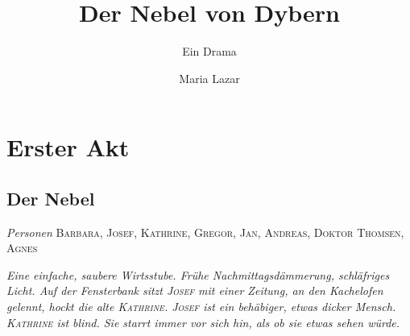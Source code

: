 \documentclass[
	final,
	a4paper,
	ngerman,
	mpinclude = true, %
	twoside = true,
	open = right,
	cleardoublepage = plain,
	DIV = 13,
	BCOR = 1cm,
	titlepage = firstiscover,
	]{scrbook}
\title{Der Nebel von Dybern}
\subtitle{Ein Drama}
\author{Maria Lazar}
\date{\ifdirectorsversion{-- Regie-Version --}{}}
\newcommand{\act}{\chapter}
\newcommand{\scene}{\setcounter{subscene}{1}\section}
\newcommand{\setting}[1]{\vspace{-0.5\baselineskip}\centering\textit{#1}}
\newcounter{subscene}
\newcommand{\characterlist}[1]{{\begin{center}\textit{Personen} #1\end{center}}}
\newcommand{\thecharacter}[1]{\textup{\textsc{#1}}\xspace}
\newcommand{\theBarbara}{\thecharacter{Barbara}}
\newcommand{\theJosef}{\thecharacter{Josef}}
\newcommand{\theKathrine}{\thecharacter{Kathrine}}
\newcommand{\theGregor}{\thecharacter{Gregor}}
\newcommand{\theJan}{\thecharacter{Jan}}
\newcommand{\theAndreas}{\thecharacter{Andreas}}
\newcommand{\theAgnes}{\thecharacter{Agnes}}
\newcommand{\theThomsen}{\thecharacter{Doktor Thomsen}}
\begin{document}
%
\cleardoubleoddemptypage

\maketitle

\tableofcontents
\cleardoubleoddpage

\pagestyle{headings}
\doublespacing

\act{Erster Akt}
\scene{Der Nebel}
\characterlist{\theBarbara, \theJosef, \theKathrine, \theGregor, \theJan, \theAndreas, \theThomsen, \theAgnes}
\setting{Eine einfache, saubere Wirtsstube. Frühe Nachmittagsdämmerung, schläfriges Licht. Auf der Fensterbank sitzt \theJosef mit einer Zeitung, an den Kachelofen gelennt, hockt die alte \theKathrine. \theJosef ist ein behäbiger, etwas dicker Mensch. \theKathrine ist blind. Sie starrt immer vor sich hin, als ob sie etwas sehen würde.}
\end{document}

